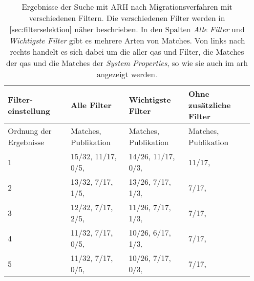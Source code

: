 \begin{table}[!h]
  \centering
  \begin{tabular}{m{2cm} m{4.3cm} m{4.3cm} m{2.5cm}}
    \toprule
    \textbf{Filter-einstellung} & \textbf{Alle Filter} & \textbf{Wichtigste Filter} & \textbf{Ohne zusätzliche Filter} \\ \hline
    Ordnung der Ergebnisse & Matches, Publikation & Matches, Publikation & Matches, Publikation \\ \midrule
    1 & 15/32, 11/17, 0/5, \cite{arh-result-no-filter-1} & 14/26, 11/17, 0/3, \cite{arh-result-no-filter-1} & 11/17, \cite{arh-result-no-filter-1}  \\ \hline
    2 & 13/32, 7/17, 1/5, \cite{arh-result-no-filter-3} & 13/26, 7/17, 1/3, \cite{arh-result-no-filter-3} & 7/17, \cite{arh-result-no-filter-2} \\ \hline
    3 & 12/32, 7/17, 2/5, \cite{arh-result-no-filter-2} & 11/26, 7/17, 1/3,  \cite{arh-result-no-filter-2} & 7/17, \cite{arh-result-no-filter-3} \\ \hline
    4 & 11/32, 7/17, 0/5, \cite{arh-result-no-filter-4} & 10/26, 6/17, 1/3, \cite{arh-result-important-filter-4} &  7/17, \cite{arh-result-no-filter-4} \\ \hline
    5 & 11/32, 7/17, 0/5, \cite{arh-result-no-filter-5} & 10/26, 7/17, 0/3, \cite{arh-result-no-filter-4} &  7/17, \cite{arh-result-no-filter-5} \\
    \bottomrule
  \end{tabular}
  \caption[Surchergebnisse des ARH von Migrationsverfahren mit verschiedenen Filtern]{
    Ergebnisse der Suche mit ARH nach Migrationsverfahren mit verschiedenen Filtern.
    Die verschiedenen Filter werden in \cref{sec:filterselektion} näher beschrieben.
    In den Spalten \emph{Alle Filter} und \emph{Wichtigste Filter} gibt es mehrere Arten von Matches.
    Von links nach rechts handelt es sich dabei um die aller \glspl{qa} und Filter, die Matches der \glspl{qa} und die Matches der \emph{System Properties}, so wie sie auch im \gls{arh} angezeigt werden.
  }
  \label{tab:phase2-filter-results}
\end{table}
